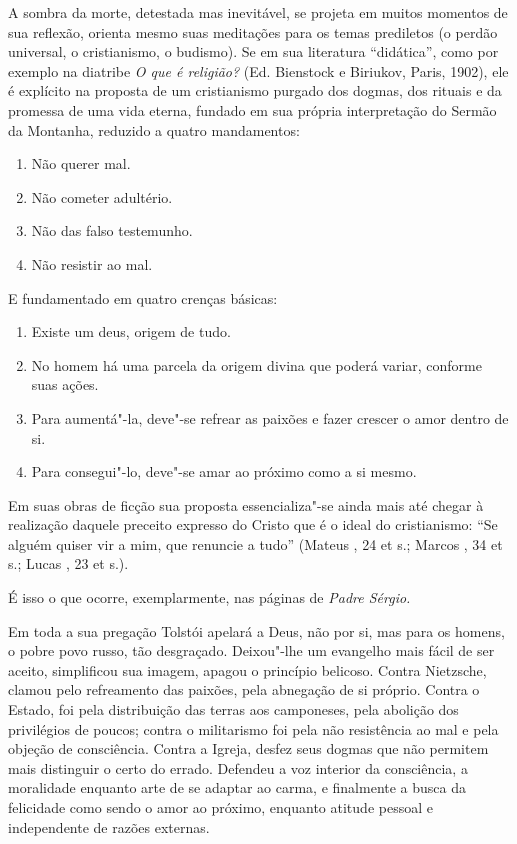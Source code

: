 A sombra da morte, detestada mas inevitável, se projeta em muitos
momentos de sua reflexão, orienta mesmo suas meditações para os temas
prediletos (o perdão universal, o cristianismo, o budismo). Se em sua
literatura ``didática'', como por exemplo na diatribe \emph{O que é
religião?} (Ed.  Bienstock e  Biriukov, Paris, 1902), ele é
explícito na proposta de um cristianismo purgado dos dogmas, dos rituais
e da promessa de uma vida eterna, fundado em sua própria interpretação
do Sermão da Montanha, reduzido a quatro mandamentos:

\begin{enumerate}
\def\labelenumi{\arabic{enumi})}
\item
  Não querer mal.
\item
  Não cometer adultério.
\item
  Não das falso testemunho.
\item
  Não resistir ao mal.
\end{enumerate}

E fundamentado em quatro crenças básicas:

\begin{enumerate}
\def\labelenumi{\arabic{enumi})}
\item
  Existe um deus, origem de tudo.
\item
  No homem há uma parcela da origem divina que poderá variar, conforme
  suas ações.
\item
  Para aumentá"-la, deve"-se refrear as paixões e fazer crescer o amor
  dentro de si.
\item
  Para consegui"-lo, deve"-se amar ao próximo como a si mesmo.
\end{enumerate}

Em suas obras de ficção sua proposta essencializa"-se ainda mais até
chegar à realização daquele preceito expresso do Cristo que é o ideal do
cristianismo: ``Se alguém quiser vir a mim, que renuncie a tudo''
(Mateus , 24 et s.; Marcos , 34 et s.; Lucas , 23 et s.).

É isso o que ocorre, exemplarmente, nas páginas de \emph{Padre Sérgio.}

Em toda a sua pregação Tolstói apelará a Deus, não por si, mas para os
homens, o pobre povo russo, tão desgraçado. Deixou"-lhe um evangelho mais
fácil de ser aceito, simplificou sua imagem, apagou o princípio
belicoso. Contra Nietzsche, clamou pelo refreamento das paixões, pela
abnegação de si próprio. Contra o Estado, foi pela distribuição das
terras aos camponeses, pela abolição dos privilégios de poucos; contra o
militarismo foi pela não resistência ao mal e pela objeção de
consciência. Contra a Igreja, desfez seus dogmas que não permitem mais
distinguir o certo do errado. Defendeu a voz interior da consciência, a
moralidade enquanto arte de se adaptar ao carma, e finalmente a busca da
felicidade como sendo o amor ao próximo, enquanto atitude pessoal e
independente de razões externas.

